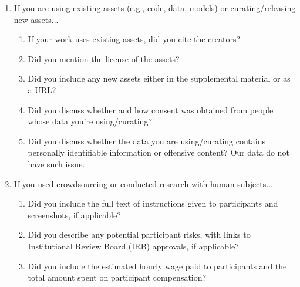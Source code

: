 \documentclass{article}
\begin{document}
\begin{enumerate}
\item If you are using existing assets (e.g., code, data, models) or curating/releasing new assets...
\begin{enumerate}
  \item If your work uses existing assets, did you cite the creators?
    \answerYes{}
  \item Did you mention the license of the assets?
    \answerYes{}
  \item Did you include any new assets either in the supplemental material or as a URL?
    \answerNo{}
  \item Did you discuss whether and how consent was obtained from people whose data you're using/curating?
    \answerYes{}
  \item Did you discuss whether the data you are using/curating contains personally identifiable information or offensive content?
    \answerNo{} Our data do not have such issue.
\end{enumerate}


\item If you used crowdsourcing or conducted research with human subjects...
\begin{enumerate}
  \item Did you include the full text of instructions given to participants and screenshots, if applicable?
    \answerNA{}
  \item Did you describe any potential participant risks, with links to Institutional Review Board (IRB) approvals, if applicable?
    \answerNA{}
  \item Did you include the estimated hourly wage paid to participants and the total amount spent on participant compensation?
    \answerNA{}
\end{enumerate}

\end{enumerate}


\end{document}

